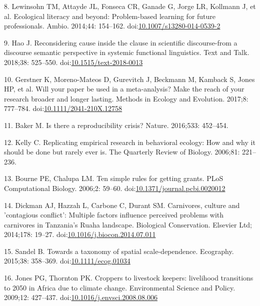 \documentclass[10pt,letterpaper]{article}
\begin{document}
\hypertarget{ref-Lewinsohn2014}{}
8. Lewinsohn TM, Attayde JL, Fonseca CR, Ganade G, Jorge LR, Kollmann J,
et al. Ecological literacy and beyond: Problem-based learning for future
professionals. Ambio. 2014;44: 154--162.
doi:\href{https://doi.org/10.1007/s13280-014-0539-2}{10.1007/s13280-014-0539-2}

\hypertarget{ref-Hao2018}{}
9. Hao J. Reconsidering cause inside the clause in scientific
discourse-from a discourse semantic perspective in systemic functional
linguistics. Text and Talk. 2018;38: 525--550.
doi:\href{https://doi.org/10.1515/text-2018-0013}{10.1515/text-2018-0013}

\hypertarget{ref-Gerstner2017}{}
10. Gerstner K, Moreno-Mateos D, Gurevitch J, Beckmann M, Kamback S,
Jones HP, et al. Will your paper be used in a meta-analysis? Make the
reach of your research broader and longer lasting. Methods in Ecology
and Evolution. 2017;8: 777--784.
doi:\href{https://doi.org/10.1111/2041-210X.12758}{10.1111/2041-210X.12758}

\hypertarget{ref-Baker2016}{}
11. Baker M. Is there a reproducibility crisis? Nature. 2016;533:
452--454.

\hypertarget{ref-Kelly2006}{}
12. Kelly C. Replicating empirical research in behavioral ecology: How
and why it should be done but rarely ever is. The Quarterly Review of
Biology. 2006;81: 221--236.

\hypertarget{ref-Bourne2006}{}
13. Bourne PE, Chalupa LM. Ten simple rules for getting grants. PLoS
Computational Biology. 2006;2: 59--60.
doi:\href{https://doi.org/10.1371/journal.pcbi.0020012}{10.1371/journal.pcbi.0020012}

\hypertarget{ref-Dickman2014}{}
14. Dickman AJ, Hazzah L, Carbone C, Durant SM. Carnivores, culture and
'contagious conflict': Multiple factors influence perceived problems
with carnivores in Tanzania's Ruaha landscape. Biological Conservation.
Elsevier Ltd; 2014;178: 19--27.
doi:\href{https://doi.org/10.1016/j.biocon.2014.07.011}{10.1016/j.biocon.2014.07.011}

\hypertarget{ref-Sandel2015}{}
15. Sandel B. Towards a taxonomy of spatial scale-dependence. Ecography.
2015;38: 358--369.
doi:\href{https://doi.org/10.1111/ecog.01034}{10.1111/ecog.01034}

\hypertarget{ref-Jones2009}{}
16. Jones PG, Thornton PK. Croppers to livestock keepers: livelihood
transitions to 2050 in Africa due to climate change. Environmental
Science and Policy. 2009;12: 427--437.
doi:\href{https://doi.org/10.1016/j.envsci.2008.08.006}{10.1016/j.envsci.2008.08.006}
\end{document}
